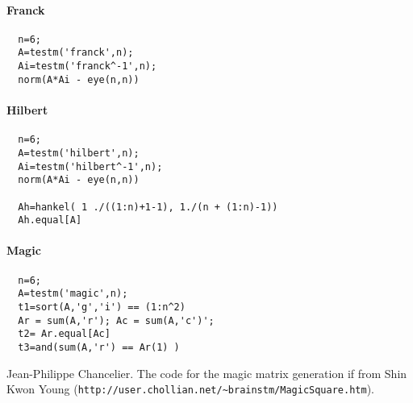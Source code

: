 \begin{examples}
\paragraph{Franck}
\begin{Verbatim}
  n=6;
  A=testm('franck',n);
  Ai=testm('franck^-1',n);
  norm(A*Ai - eye(n,n))
\end{Verbatim}

\paragraph{Hilbert}
\begin{Verbatim}
  n=6;
  A=testm('hilbert',n);
  Ai=testm('hilbert^-1',n);
  norm(A*Ai - eye(n,n))

  Ah=hankel( 1 ./((1:n)+1-1), 1./(n + (1:n)-1))
  Ah.equal[A]
\end{Verbatim}

\paragraph{Magic} 
\begin{Verbatim}
  n=6;
  A=testm('magic',n);
  t1=sort(A,'g','i') == (1:n^2)
  Ar = sum(A,'r'); Ac = sum(A,'c')';
  t2= Ar.equal[Ac] 
  t3=and(sum(A,'r') == Ar(1) )
\end{Verbatim}
\end{examples}

\begin{manseealso}
\end{manseealso}
\begin{authors}
  Jean-Philippe Chancelier. The code for the magic matrix generation 
  if from Shin Kwon Young (\verb+http://user.chollian.net/~brainstm/MagicSquare.htm+).
\end{authors}

